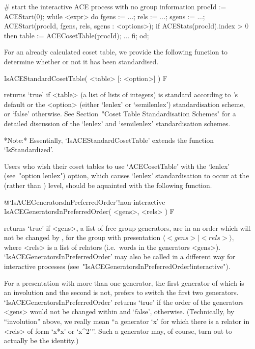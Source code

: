 \# start the interactive ACE process with no group information
procId := ACEStart(0);
while <expr> do
fgens := ...; rels := ...; sgens := ...;
ACEStart(procId, fgens, rels, sgens : <options>);
if ACEStats(procId).index > 0 then
table := ACECosetTable(procId);
...
fi;
od;

For an already  calculated  coset  table,  we  provide  the  following
function to determine whether or not it has been standardised.

\>IsACEStandardCosetTable( <table> [: <option>] ) F

returns `true' if <table> (a list of lists of  integers)  is  standard
according to {\GAP}'s default or  the  <option>  (either  `lenlex'  or
`semilenlex')  standardisation  scheme,  or  `false'  otherwise.   See
Section~"Coset  Table  Standardisation   Schemes"   for   a   detailed
discussion of the `lenlex' and `semilenlex' standardisation schemes.

*Note:*
Essentially, `IsACEStandardCosetTable'  extends  the  {\GAP}  function
`IsStandardized'.

Users who wish their coset tables  to  use  `ACECosetTable'  with  the
`lenlex'    (see~"option     lenlex")     option,     which     causes
`lenlex' standardisation to occur at the {\ACE} (rather  than  {\GAP})
level, should be aquainted with the following function.

%
{@\noexpand`IsACEGeneratorsInPreferredOrder'!non-interactive}
\>IsACEGeneratorsInPreferredOrder( <gens>, <rels> ) F

returns `true' if <gens>, a list of free group generators, are  in  an
order which will  not  be  changed  by  {\ACE},  for  the  group  with
presentation $\langle <gens> \mid <rels>\rangle$, where  <rels>  is  a
list   of   relators   (i.e.~words   in   the   generators    <gens>).
`IsACEGeneratorsInPreferredOrder' may also be called  in  a  different
way         for         interactive          {\ACE}          processes
(see~"IsACEGeneratorsInPreferredOrder!interactive").

For a presentation with more than one generator, the  first  generator
of which is an involution and the second is  not,  {\ACE}  prefers  to
switch the  first  two  generators.  `IsACEGeneratorsInPreferredOrder'
returns `true' if the order of the  generators  <gens>  would  not  be
changed  within  {\ACE}  and  `false',  otherwise.  (Technically,   by
``involution'' above, we really mean ``a generator `x' for which there
is a relator in <rels> of form `x*x' or `x^2'''. Such a generator may,
of course, turn out to actually be the identity.)

